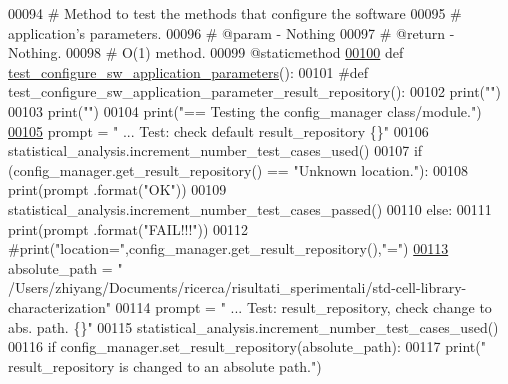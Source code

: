\begin{DoxyCode}
00094     \textcolor{comment}{#   Method to test the methods that configure the software}
00095     \textcolor{comment}{#       application's parameters.}
00096     \textcolor{comment}{#   @param - Nothing}
00097     \textcolor{comment}{#   @return - Nothing.}
00098     \textcolor{comment}{#   O(1) method.}
00099     @staticmethod
\hypertarget{configuration__manager__tester_8py_source_l00100}{}\hyperlink{classutilities_1_1configuration__manager__tester_1_1config__manager__tester_a1f30cbc427332b33d4e4a8e32ae3b980}{00100}     \textcolor{keyword}{def }\hyperlink{classutilities_1_1configuration__manager__tester_1_1config__manager__tester_a1f30cbc427332b33d4e4a8e32ae3b980}{test\_configure\_sw\_application\_parameters}():
00101     \textcolor{comment}{#def test\_configure\_sw\_application\_parameter\_result\_repository():}
00102         print(\textcolor{stringliteral}{""})
00103         print(\textcolor{stringliteral}{""})
00104         print(\textcolor{stringliteral}{"==   Testing the config\_manager class/module."})
\hypertarget{configuration__manager__tester_8py_source_l00105}{}\hyperlink{classutilities_1_1configuration__manager__tester_1_1config__manager__tester_aa2904b10cd29c4fe16374fa249686be2}{00105}         prompt = \textcolor{stringliteral}{"  ... Test: check default result\_repository       \{\}"}
00106         statistical\_analysis.increment\_number\_test\_cases\_used()
00107         \textcolor{keywordflow}{if} (config\_manager.get\_result\_repository() == \textcolor{stringliteral}{"Unknown location."}):
00108             print(prompt .format(\textcolor{stringliteral}{"OK"}))
00109             statistical\_analysis.increment\_number\_test\_cases\_passed()
00110         \textcolor{keywordflow}{else}:
00111             print(prompt .format(\textcolor{stringliteral}{"FAIL!!!"}))
00112             \textcolor{comment}{#print("location=",config\_manager.get\_result\_repository(),"=")}
\hypertarget{configuration__manager__tester_8py_source_l00113}{}\hyperlink{classutilities_1_1configuration__manager__tester_1_1config__manager__tester_aa23d0c5b64043e706aa32519034a37e8}{00113}         absolute\_path = \textcolor{stringliteral}{"
      /Users/zhiyang/Documents/ricerca/risultati\_sperimentali/std-cell-library-characterization"}
00114         prompt = \textcolor{stringliteral}{"  ... Test: result\_repository, check change to abs. path. \{\}"}
00115         statistical\_analysis.increment\_number\_test\_cases\_used()
00116         \textcolor{keywordflow}{if} config\_manager.set\_result\_repository(absolute\_path):
00117             print(\textcolor{stringliteral}{" result\_repository is changed to an absolute path."})

\end{DoxyCode}
